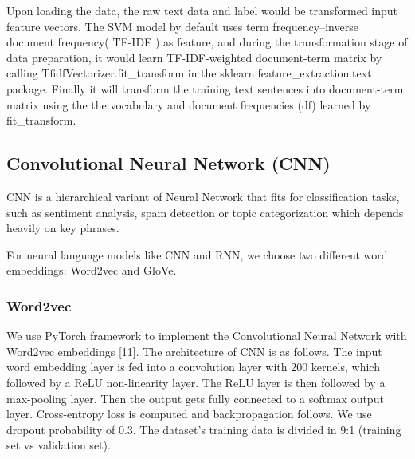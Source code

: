 \documentclass{article}
\begin{document}
 Upon loading the data, the raw text data and label would be transformed input feature vectors. The SVM model by default uses term frequency–inverse document frequency( TF-IDF ) as feature, and during the transformation stage of data preparation, it would learn TF-IDF-weighted document-term matrix by calling TfidfVectorizer.fit\_transform in the sklearn.feature\_extraction.text package. Finally it will transform the training text sentences into document-term matrix using the the vocabulary and document frequencies (df) learned by fit\_transform.


\subsection{Convolutional Neural Network (CNN)}
CNN is a hierarchical variant of Neural Network that fits for classification tasks, such as sentiment analysis, spam detection or topic categorization which depends heavily on key phrases.

For neural language models like CNN and RNN, we choose two different word embeddings: Word2vec and GloVe.

\subsubsection{Word2vec}
We use PyTorch framework to implement the Convolutional Neural Network with Word2vec embeddings [11]. The architecture of CNN is as follows. The input word embedding layer is fed into a convolution layer with 200 kernels, which followed by a ReLU non-linearity layer. The ReLU layer is then followed by a max-pooling layer. Then the output gets fully connected to a softmax output layer. Cross-entropy loss is computed and backpropagation follows. We use dropout probability of 0.3. The dataset's training data is divided in 9:1 (training set vs validation set).
\end{document}
